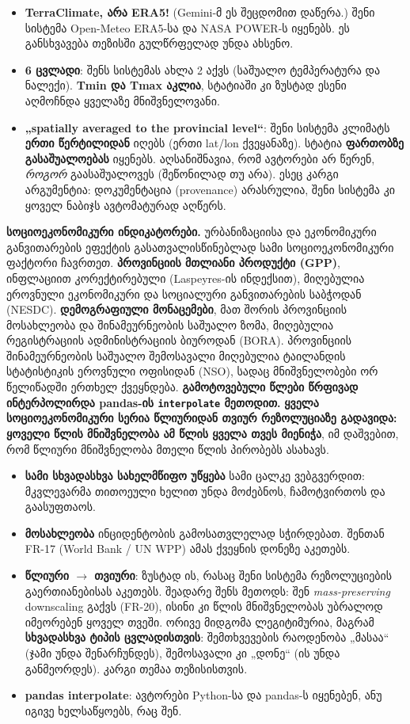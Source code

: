 \documentclass[11pt,a4paper]{article}
\newcommand{\imp}[1]{\textbf{\color{importred}#1}}
\begin{document}
\begin{etl}
\begin{itemize}[leftmargin=1.5em]
  \item \textbf{TerraClimate, არა ERA5!} (Gemini-მ ეს შეცდომით დაწერა.) შენი სისტემა Open-Meteo ERA5-სა და NASA POWER-ს იყენებს. ეს განსხვავება თეზისში გულწრფელად უნდა ახსენო.
  \item \textbf{6 ცვლადი}: შენს სისტემას ახლა 2 აქვს (საშუალო ტემპერატურა და ნალექი). \imp{Tmin და Tmax აკლია}, სტატიაში კი ზუსტად ესენი აღმოჩნდა ყველაზე მნიშვნელოვანი.
  \item \textbf{„spatially averaged to the provincial level“}: შენი სისტემა კლიმატს \imp{ერთი წერტილიდან} იღებს (ერთი lat/lon ქვეყანაზე). სტატია \textbf{ფართობზე გასაშუალოებას} იყენებს. აღსანიშნავია, რომ ავტორები არ წერენ, \textit{როგორ} გაასაშუალოვეს (შეწონილად თუ არა). ესეც კარგი არგუმენტია: დოკუმენტაცია (provenance) არასრულია, შენი სისტემა კი ყოველ ნაბიჯს ავტომატურად აღწერს.
\end{itemize}
\end{etl}

\textbf{სოციოეკონომიკური ინდიკატორები.} ურბანიზაციისა და ეკონომიკური განვითარების ეფექტის გასათვალისწინებლად
სამი სოციოეკონომიკური ფაქტორი ჩავრთეთ. \imp{პროვინციის მთლიანი პროდუქტი (GPP)}, ინფლაციით
კორექტირებული (Laspeyres-ის ინდექსით), მიღებულია ეროვნული ეკონომიკური და სოციალური განვითარების
საბჭოდან (NESDC). \imp{დემოგრაფიული მონაცემები}, მათ შორის პროვინციის მოსახლეობა და შინამეურნეობის საშუალო
ზომა, მიღებულია რეგისტრაციის ადმინისტრაციის ბიუროდან (BORA). პროვინციის შინამეურნეობის საშუალო შემოსავალი
მიღებულია ტაილანდის სტატისტიკის ეროვნული ოფისიდან (NSO), სადაც მნიშვნელობები ორ წელიწადში ერთხელ
ქვეყნდება. \imp{გამოტოვებული წლები წრფივად ინტერპოლირდა pandas-ის \texttt{interpolate} მეთოდით.}
\imp{ყველა სოციოეკონომიკური სერია წლიურიდან თვიურ რეზოლუციაზე გადავიდა: ყოველი წლის მნიშვნელობა ამ წლის
ყველა თვეს მიენიჭა}, იმ დაშვებით, რომ წლიური მნიშვნელობა მთელი წლის პირობებს ასახავს.

\begin{etl}
\begin{itemize}[leftmargin=1.5em]
  \item \textbf{სამი სხვადასხვა სახელმწიფო უწყება} სამი ცალკე ვებგვერდით: მკვლევარმა თითოეული ხელით უნდა მოძებნოს, ჩამოტვირთოს და გაასუფთაოს.
  \item \textbf{მოსახლეობა} ინციდენტობის გამოსათვლელად სჭირდებათ. შენთან FR-17 (World Bank / UN WPP) ამას ქვეყნის დონეზე აკეთებს.
  \item \textbf{წლიური $
\rightarrow$ თვიური}: ზუსტად ის, რასაც შენი სისტემა რეზოლუციების გაერთიანებისას აკეთებს. შეადარე შენს მეთოდს: შენ \textit{mass-preserving} downscaling გაქვს (FR-20), ისინი კი წლის მნიშვნელობას უბრალოდ იმეორებენ ყოველ თვეში. ორივე მიდგომა ლეგიტიმურია, მაგრამ \textbf{სხვადასხვა ტიპის ცვლადისთვის}: შემთხვევების რაოდენობა „მასაა“ (ჯამი უნდა შენარჩუნდეს), შემოსავალი კი „დონე“ (ის უნდა განმეორდეს). კარგი თემაა თეზისისთვის.
  \item \textbf{pandas interpolate}: ავტორები Python-სა და pandas-ს იყენებენ, ანუ იგივე ხელსაწყოებს, რაც შენ.
\end{itemize}
\end{etl}
\end{document}
